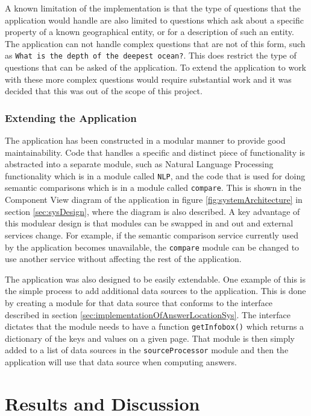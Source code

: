 \documentclass[authoryearcitations]{UoYCSproject}
\begin{document}
A known limitation of the implementation is that the type of questions that the application would handle are also limited to questions which ask about a specific property of a known geographical entity, or for a description of such an entity. The application can not handle complex questions that are not of this form, such as \texttt{What is the depth of the deepest ocean?}. This does restrict the type of questions that can be asked of the application. To extend the application to work with these more complex questions would require substantial work and it was decided that this was out of the scope of this project.

\subsection{Extending the Application}

The application has been constructed in a modular manner to provide good maintainability. Code that handles a specific and distinct piece of functionality is abstracted into a separate module, such as Natural Language Processing functionality which is in a module called \texttt{NLP}, and the code that is used for doing semantic comparisons which is in a module called \texttt{compare}. This is shown in the Component View diagram of the application in figure \ref{fig:systemArchitecture} in section \ref{sec:sysDesign}, where the diagram is also described. A key advantage of this modulear design is that modules can be swapped in and out and external services change. For example, if the semantic comparison service currently used by the application becomes unavailable, the \texttt{compare} module can be changed to use another service without affecting the rest of the application.

The application was also designed to be easily extendable. One example of this is the simple process to add additional data sources to the application. This is done by creating a module for that data source that conforms to the interface described in section \ref{sec:implementationOfAnswerLocationSys}. The interface dictates that the module needs to have a function \texttt{getInfobox()} which returns a dictionary of the keys and values on a given page. That module is then simply added to a list of data sources in the \texttt{sourceProcessor} module and then the application will use that data source when computing answers.

\newpage
\chapter{Results and Discussion}
\label{chapter:results}
\end{document}
